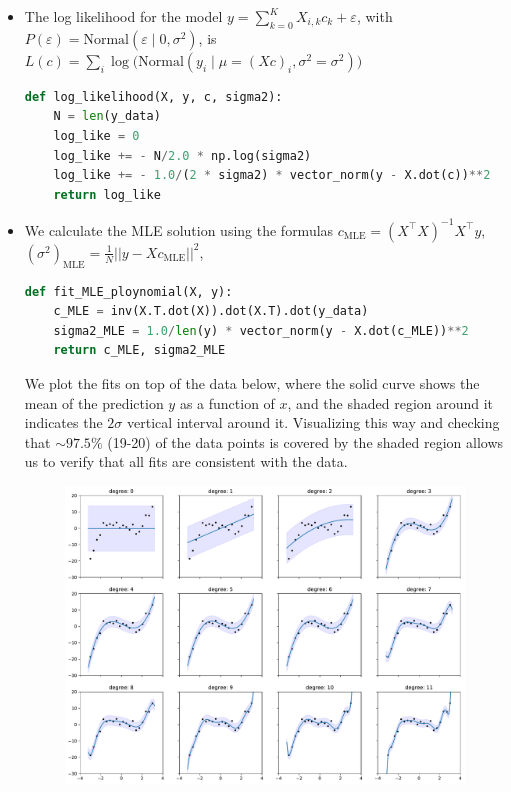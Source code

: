 \begin{itemize}
	\item The log likelihood for the model
	$y = \sum_{k=0}^K X_{i,k} c_k  + \varepsilon$, with $P(\varepsilon) = \text{Normal}(\varepsilon \;|\; 0, \sigma^2)$, is $L(c) = \sum_i\log\Big( \text{Normal}(y_i\;|\; \mu = (Xc)_i, \sigma^2 = \sigma^2)\Big)$
\begin{lstlisting}[language=python]
def log_likelihood(X, y, c, sigma2):
    N = len(y_data)
    log_like = 0
    log_like += - N/2.0 * np.log(sigma2)
    log_like += - 1.0/(2 * sigma2) * vector_norm(y - X.dot(c))**2
    return log_like
\end{lstlisting}

	\item We calculate the MLE solution using the formulas $c_\text{MLE}= (X^\top X)^{-1} X^\top y$, \quad $(\sigma^2)_\text{MLE} = \frac{1}{N}||y - X c_\text{MLE}||^2$,
\begin{lstlisting}[language=python]
def fit_MLE_ploynomial(X, y):
    c_MLE = inv(X.T.dot(X)).dot(X.T).dot(y_data)
    sigma2_MLE = 1.0/len(y) * vector_norm(y - X.dot(c_MLE))**2
    return c_MLE, sigma2_MLE
\end{lstlisting}
 	We plot the fits on top of the data below, where the solid curve shows the mean of the prediction $y$ as a function of $x$, and the shaded region around it indicates the $2\sigma$ vertical interval around it. Visualizing this way and checking that $\sim 97.5\%$ (19-20) of the data points is covered by the shaded region allows us to verify that all fits are consistent with the data. 
	\begin{figure}[h]
		\centering
		\includegraphics[width=\textwidth]{./figs/03-linear-regression-fits.pdf}
	\end{figure}

\end{itemize}

